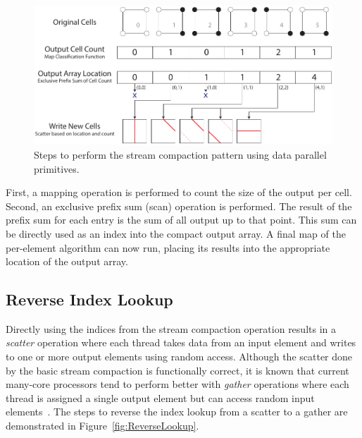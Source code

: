 \documentclass{superfri}
\newcommand*{\lcite}[1]{~\cite{#1}}
\newcommand*{\keyterm}[1]{\emph{#1}}
\begin{document}
\begin{figure}[htb]
  \centering
  \includegraphics[scale=.9]{images/StreamCompaction}
  \caption{Steps to perform the stream compaction pattern using data
    parallel primitives.}
  \label{fig:StreamCompaction}
\end{figure}

First, a mapping operation is performed to count the size of the output per
cell. Second, an exclusive prefix sum (scan) operation is performed. The
result of the prefix sum for each entry is the sum of all output up to
that point. This sum can be directly used as an index into the compact
output array. A final map of the per-element algorithm can now run, placing
its results into the appropriate location of the output array.

\subsection{Reverse Index Lookup}

\noindent
Directly using the indices from the stream compaction operation results in
a \keyterm{scatter} operation where each thread takes data from an input
element and writes to one or more output elements using random access.
Although the scatter done by the basic stream compaction is functionally
correct, it is known that current many-core processors tend to perform
better with \keyterm{gather} operations where each thread is assigned a
single output element but can access random input
elements\lcite{Stratton2012}. The steps to reverse the index lookup from a
scatter to a gather are demonstrated in Figure~\ref{fig:ReverseLookup}.
\end{document}

